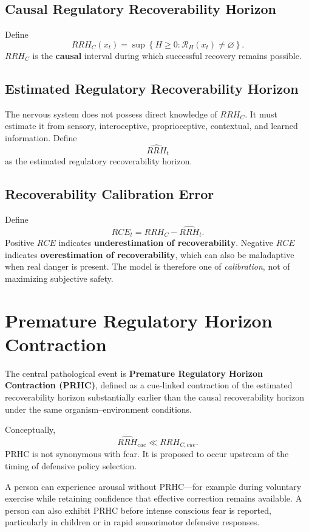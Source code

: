 \documentclass[11pt]{article}
\begin{document}
\subsection{Causal Regulatory Recoverability Horizon}

Define
\[
RRH_C(x_t)=\sup\left\{H\ge 0:\mathcal{R}_H(x_t)\neq\varnothing\right\}.
\]
$RRH_C$ is the \textbf{causal} interval during which successful recovery remains possible.

\subsection{Estimated Regulatory Recoverability Horizon}

The nervous system does not possess direct knowledge of $RRH_C$. It must estimate it from sensory, interoceptive, proprioceptive, contextual, and learned information. Define
\[
\widehat{RRH}_t
\]
as the estimated regulatory recoverability horizon.

\subsection{Recoverability Calibration Error}

Define
\[
RCE_t=RRH_C-\widehat{RRH}_t.
\]
Positive $RCE$ indicates \textbf{underestimation of recoverability}. Negative $RCE$ indicates \textbf{overestimation of recoverability}, which can also be maladaptive when real danger is present. The model is therefore one of \emph{calibration}, not of maximizing subjective safety.

\section{Premature Regulatory Horizon Contraction}

The central pathological event is \textbf{Premature Regulatory Horizon Contraction (PRHC)}, defined as a cue-linked contraction of the estimated recoverability horizon substantially earlier than the causal recoverability horizon under the same organism--environment conditions.

Conceptually,
\[
\widehat{RRH}_{cue}\ll RRH_{C,cue}.
\]
PRHC is not synonymous with fear. It is proposed to occur upstream of the timing of defensive policy selection.

A person can experience arousal without PRHC---for example during voluntary exercise while retaining confidence that effective correction remains available. A person can also exhibit PRHC before intense conscious fear is reported, particularly in children or in rapid sensorimotor defensive responses.
\end{document}
